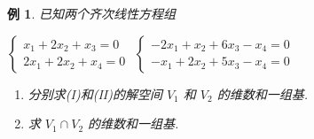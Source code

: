 \documentclass[13pt]{beamer}
\newtheorem{exa}{例}
\begin{document}
\begin{frame}
\begin{exa}已知两个齐次线性方程组
\begin{center}
 $\left\{\begin{array}{c}x_{1}+2 x_{2}+x_{3}=0 \\ 2 x_{1}+2 x_{2}+x_{4}=0\end{array}\right.$ \qquad
 $\left\{\begin{array}{l}-2 x_{1}+x_{2}+6 x_{3}-x_{4}=0 \\ -x_{1}+2 x_{2}+5 x_{3}-x_{4}=0\end{array}\right.$
\end{center}
\begin{enumerate}
\item 分别求(I)和(II)的解空间 $V_{1}$ 和 $V_{2}$ 的维数和一组基.

\item 求 $V_{1} \cap V_{2}$ 的维数和一组基.
\end{enumerate}
\end{exa}
\end{frame}
\end{document}

